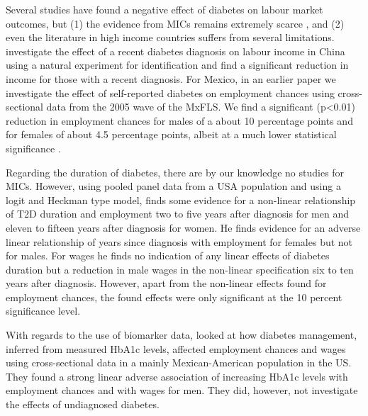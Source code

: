 Several studies have found a negative effect of diabetes on labour market outcomes, but (1) the evidence from \ac{MICs} remains
extremely scarce \citep{Seuring2015a}, and (2) even the literature
in high income countries suffers from several limitations.  \citet{Liu2014}
investigate the effect of a recent diabetes diagnosis on labour income
in China using a natural experiment for identification and find a
significant reduction in income for those with a recent diagnosis.
For Mexico, in an earlier paper we investigate the effect of self-reported
diabetes on employment chances using cross-sectional data from the
2005 wave of the \ac{MxFLS}. We find a significant (p<0.01) reduction
in employment chances for males of a about 10 percentage points and
for females of about 4.5 percentage points, albeit at a much lower
statistical significance \citep{Seuring2015}.

Regarding the duration of diabetes, there are by our knowledge no
studies for \ac{MICs}. However, using pooled panel data from a
\ac{USA} population and using a logit and Heckman type model, \citet{Minor2013}
finds some evidence for a non-linear relationship of \ac{T2D} duration
and employment two to five years after diagnosis for men and eleven
to fifteen years after diagnosis for women. He finds evidence for
an adverse linear relationship of years since diagnosis with employment
for females but not for males. For wages he finds no indication of
any linear effects of diabetes duration but a reduction in male wages
in the non-linear specification six to ten years after diagnosis.
However, apart from the non-linear effects found for employment chances,
the found effects were only significant at the 10 percent significance
level.

With regards to the use of biomarker data,\citet{BrownIII2011} looked
at how diabetes management, inferred from measured \ac{HbA1c} levels,
affected employment chances and wages using cross-sectional data in
a mainly Mexican-American population in the US. They found a strong
linear adverse association of increasing \ac{HbA1c} levels with
employment chances and with wages for men. They did, however, not investigate the effects of undiagnosed diabetes.

